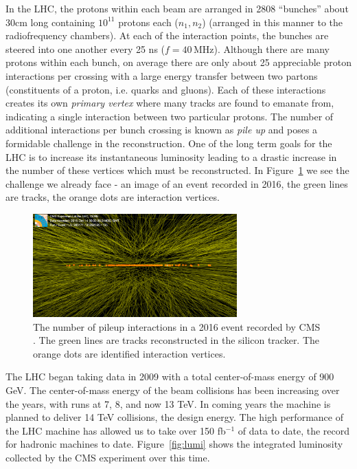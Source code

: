 In the LHC, the protons within each beam are arranged in 2808 ``bunches'' about 30cm long containing $10^{11}$ protons each ($n_{1}, n_{2}$) (arranged in this manner to the radiofrequency chambers). At each of the interaction points, the bunches are steered into one another every 25 ns ($f=40\,\textrm{MHz}$). Although there are many protons within each bunch, on average there are only about 25 appreciable proton interactions per crossing with a large energy transfer between two partons (constituents of a proton, i.e. quarks and gluons). Each of these interactions creates its own \textit{primary vertex} where many tracks are found to emanate from, indicating a single interaction between two particular protons. The number of additional interactions per bunch crossing is known as \textit{pile up} and poses a formidable challenge in the reconstruction. One of the long term goals for the LHC is to increase its instantaneous luminosity leading to a drastic increase in the number of these vertices which must be reconstructed. In Figure~\ref{fig:pu} we see  the challenge we already face - an image of an event recorded in 2016, the green lines are tracks, the orange dots are interaction vertices.

\begin{figure}
\centering
\includegraphics[width=0.7\textwidth]{figs/highpileup0_4.png}
\caption[The number of pileup interactions in a 2016 event recorded by CMS.]{The number of pileup interactions in a 2016 event recorded by CMS \cite{pu}. The green lines are tracks reconstructed in the silicon tracker. The orange dots are identified interaction vertices.}
\label{fig:pu}
\end{figure}

The LHC began taking data in 2009 with a total center-of-mass energy of 900 GeV. The center-of-mass energy of the beam collisions has been increasing over the years, with runs at 7, 8, and now 13 TeV. In coming years the machine is planned to deliver 14 TeV collisions, the design energy. The high performance of the LHC machine has allowed us to take over 150 fb$^{-1}$ of data to date, the record for hadronic machines to date. Figure~\ref{fig:lumi} shows the integrated luminosity collected by the CMS experiment over this time.

